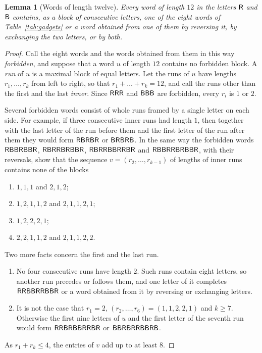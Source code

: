 \documentclass[11pt,reqno]{amsart}
\numberwithin{equation}{section}
\theoremstyle{plain}
\newtheorem{lemma}[theorem]{Lemma}
\theoremstyle{definition}
\theoremstyle{remark}
\newcommand{\w}[1]{\textsf{\upshape #1}}
\begin{document}
\begin{lemma}[Words of length twelve]
\label{lem:words}
Every word of length $12$ in the letters $\w{R}$ and $\w{B}$ contains, as
a block of consecutive letters, one of the eight words of
Table~\ref{tab:gadgets} or a word obtained from one of them by reversing
it, by exchanging the two letters, or by both.
\end{lemma}

\begin{proof}
Call the eight words and the words obtained from them in this way
\emph{forbidden}, and suppose that a word $u$ of length $12$ contains no
forbidden block. A \emph{run} of $u$ is a maximal block of equal letters.
Let the runs of $u$ have lengths $r_1,\dots,r_k$ from left to right, so
that $r_1+\dots+r_k=12$, and call the runs other than the first and the
last \emph{inner}. Since $\w{RRR}$ and $\w{BBB}$ are forbidden, every
$r_i$ is $1$ or $2$.

Several forbidden words consist of whole runs framed by a single letter on
each side. For example, if three consecutive inner runs had length $1$,
then together with the last letter of the run before them and the first
letter of the run after them they would form $\w{RBRBR}$ or $\w{BRBRB}$.
In the same way the forbidden words $\w{RBBRBBR}$, $\w{RBRRBRBBR}$,
$\w{RBRRBBRRBR}$ and $\w{RBBRRBRBBR}$, with their reversals, show that the
sequence $v=(r_2,\dots,r_{k-1})$ of lengths of inner runs contains none of
the blocks
\begin{enumerate}[label=\textup{(\alph*)},leftmargin=2em]
\item $1,1,1$ and $2,1,2$;
\item $1,2,1,1,2$ and $2,1,1,2,1$;
\item $1,2,2,2,1$;
\item $2,2,1,1,2$ and $2,1,1,2,2$.
\end{enumerate}
Two more facts concern the first and the last run.
\begin{enumerate}[label=\textup{(\alph*)},leftmargin=2em,resume]
\item No four consecutive runs have length $2$. Such runs contain eight
letters, so another run precedes or follows them, and one letter of it
completes $\w{RRBBRRBBR}$ or a word obtained from it by reversing or
exchanging letters.
\item It is not the case that $r_1=2$, $(r_2,\dots,r_6)=(1,1,2,2,1)$ and
$k\ge7$. Otherwise the first nine letters of $u$ and the first letter of
the seventh run would form $\w{RRBRBBRRBR}$ or $\w{BBRBRRBBRB}$.
\end{enumerate}
As $r_1+r_k\le4$, the entries of $v$ add up to at least $8$.


\end{proof}
\end{document}
